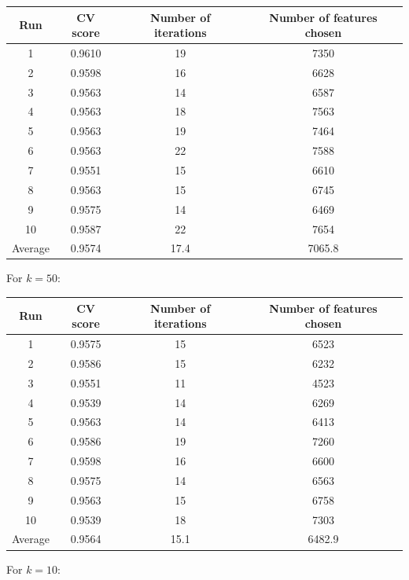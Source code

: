 \documentclass[12pt, twoside, a4paper]{report}
\begin{document}
\begin{center}
    \begin{tabular}{| c | c | c | c | } \hline
    Run & CV score & Number of iterations & Number of features chosen \\ \hline \hline
    1 & 0.9610 & 19 & 7350 \\ \hline
	2 & 0.9598  & 16 & 6628 \\ \hline
	3 & 0.9563 & 14 & 6587 \\ \hline
	4 & 0.9563 & 18 & 7563 \\ \hline
	5 & 0.9563 & 19 & 7464 \\ \hline
	6 & 0.9563 & 22 & 7588 \\ \hline
	7 & 0.9551 & 15 & 6610 \\ \hline
	8 & 0.9563 & 15 & 6745 \\ \hline
	9 & 0.9575 & 14 & 6469 \\ \hline
	10 & 0.9587 & 22 & 7654 \\ \hline
	Average & 0.9574 & 17.4 & 7065.8 \\ \hline
    \end{tabular}
\end{center}

For $k=50$:

\begin{center}
    \begin{tabular}{| c | c | c | c | } \hline
    Run & CV score & Number of iterations & Number of features chosen \\ \hline \hline
    1 & 0.9575 & 15 & 6523 \\ \hline
	2 & 0.9586  & 15 & 6232 \\ \hline
	3 & 0.9551 & 11 & 4523 \\ \hline
	4 & 0.9539 & 14 & 6269 \\ \hline
	5 & 0.9563 & 14 & 6413 \\ \hline
	6 & 0.9586 & 19 & 7260 \\ \hline
	7 & 0.9598 & 16 & 6600 \\ \hline
	8 & 0.9575 & 14 & 6563 \\ \hline
	9 & 0.9563 & 15 & 6758 \\ \hline
	10 & 0.9539 & 18 & 7303 \\ \hline
	Average & 0.9564 & 15.1 & 6482.9 \\ \hline
    \end{tabular}
\end{center}


For $k=10$:
\end{document}
